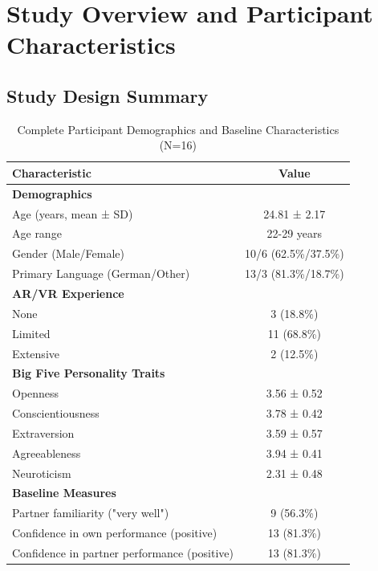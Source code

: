 \section{Study Overview and Participant Characteristics}
\label{appendix:study_overview}

\subsection{Study Design Summary}
\label{appendix:participants}

\begin{table}[H]
\centering
\caption{Complete Participant Demographics and Baseline Characteristics (N=16)}
\label{tab:demographics_appendix}
\begin{tabular}{lc}
\toprule
\textbf{Characteristic} & \textbf{Value} \\
\midrule
\textbf{Demographics} & \\
Age (years, mean ± SD) & 24.81 ± 2.17 \\
Age range & 22-29 years \\
Gender (Male/Female) & 10/6 (62.5\%/37.5\%) \\
Primary Language (German/Other) & 13/3 (81.3\%/18.7\%) \\
\midrule
\textbf{AR/VR Experience} & \\
None & 3 (18.8\%) \\
Limited & 11 (68.8\%) \\
Extensive & 2 (12.5\%) \\
\midrule
\textbf{Big Five Personality Traits} & \\
Openness & 3.56 ± 0.52 \\
Conscientiousness & 3.78 ± 0.42 \\
Extraversion & 3.59 ± 0.57 \\
Agreeableness & 3.94 ± 0.41 \\
Neuroticism & 2.31 ± 0.48 \\
\midrule
\textbf{Baseline Measures} & \\
Partner familiarity ("very well") & 9 (56.3\%) \\
Confidence in own performance (positive) & 13 (81.3\%) \\
Confidence in partner performance (positive) & 13 (81.3\%) \\
\bottomrule
\end{tabular}
\end{table}

